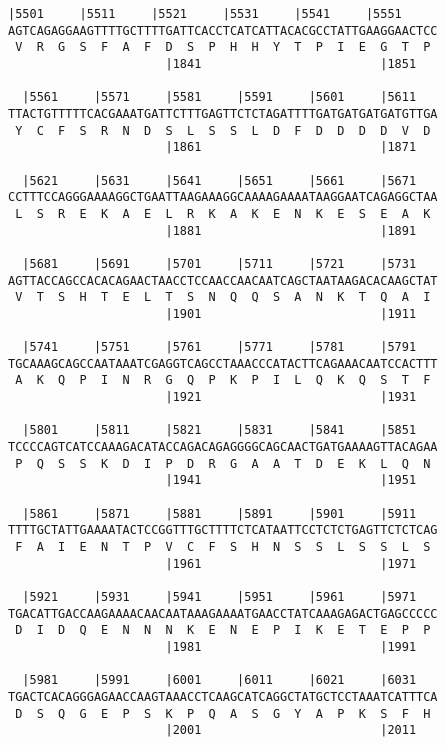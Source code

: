 \documentclass{article}
\begin{document}
\newpage
\begin{Verbatim}[fontfamily=courier]
  |5501     |5511     |5521     |5531     |5541     |5551   
AGTCAGAGGAAGTTTTGCTTTTGATTCACCTCATCATTACACGCCTATTGAAGGAACTCC
 V  R  G  S  F  A  F  D  S  P  H  H  Y  T  P  I  E  G  T  P 
                      |1841                         |1851   

  |5561     |5571     |5581     |5591     |5601     |5611   
TTACTGTTTTTCACGAAATGATTCTTTGAGTTCTCTAGATTTTGATGATGATGATGTTGA
 Y  C  F  S  R  N  D  S  L  S  S  L  D  F  D  D  D  D  V  D 
                      |1861                         |1871   

  |5621     |5631     |5641     |5651     |5661     |5671   
CCTTTCCAGGGAAAAGGCTGAATTAAGAAAGGCAAAAGAAAATAAGGAATCAGAGGCTAA
 L  S  R  E  K  A  E  L  R  K  A  K  E  N  K  E  S  E  A  K 
                      |1881                         |1891   

  |5681     |5691     |5701     |5711     |5721     |5731   
AGTTACCAGCCACACAGAACTAACCTCCAACCAACAATCAGCTAATAAGACACAAGCTAT
 V  T  S  H  T  E  L  T  S  N  Q  Q  S  A  N  K  T  Q  A  I 
                      |1901                         |1911   

  |5741     |5751     |5761     |5771     |5781     |5791   
TGCAAAGCAGCCAATAAATCGAGGTCAGCCTAAACCCATACTTCAGAAACAATCCACTTT
 A  K  Q  P  I  N  R  G  Q  P  K  P  I  L  Q  K  Q  S  T  F 
                      |1921                         |1931   

  |5801     |5811     |5821     |5831     |5841     |5851   
TCCCCAGTCATCCAAAGACATACCAGACAGAGGGGCAGCAACTGATGAAAAGTTACAGAA
 P  Q  S  S  K  D  I  P  D  R  G  A  A  T  D  E  K  L  Q  N 
                      |1941                         |1951   

  |5861     |5871     |5881     |5891     |5901     |5911   
TTTTGCTATTGAAAATACTCCGGTTTGCTTTTCTCATAATTCCTCTCTGAGTTCTCTCAG
 F  A  I  E  N  T  P  V  C  F  S  H  N  S  S  L  S  S  L  S 
                      |1961                         |1971   

  |5921     |5931     |5941     |5951     |5961     |5971   
TGACATTGACCAAGAAAACAACAATAAAGAAAATGAACCTATCAAAGAGACTGAGCCCCC
 D  I  D  Q  E  N  N  N  K  E  N  E  P  I  K  E  T  E  P  P 
                      |1981                         |1991   

  |5981     |5991     |6001     |6011     |6021     |6031   
TGACTCACAGGGAGAACCAAGTAAACCTCAAGCATCAGGCTATGCTCCTAAATCATTTCA
 D  S  Q  G  E  P  S  K  P  Q  A  S  G  Y  A  P  K  S  F  H 
                      |2001                         |2011   

\end{Verbatim}
\end{document}
